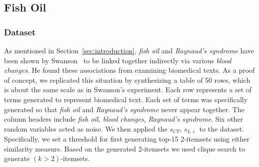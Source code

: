 
\subsection{Fish Oil}
\subsubsection{Dataset}
As mentioned in Section~\ref{sec:introduction}, \emph{fish oil} and \emph{Raynaud's syndrome} have been shown by Swanson~\cite{swanson87} to be linked together indirectly via various \emph{blood changes}.  He found these associations from examining biomedical texts.  As a proof of concept, we replicated this situation by synthesizing a table of 50 rows, which is about the same scale as in Swanson's experiment.  Each row represents a set of terms generated to represent biomedical text.   Each set of terms was specifically generated so that \emph{fish oil} and \emph{Raynaud's syndrome} never appear together. The column headers include \emph{fish oil, blood changes}, \emph{Raynaud's syndrome}.  Six other random variables acted as noise.  We then applied the $s_{CT}$, $s_{L+}$ to the dataset. Specifically, we set a threshold for first generating top-15 2-itemsets using either similarity measure. Based on the generated 2-itemsets we used clique search to generate $(k>2)$-itemsets.


